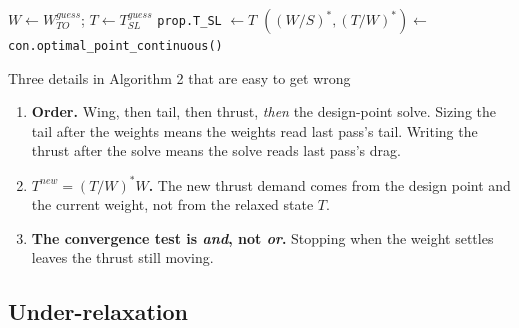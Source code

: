 \documentclass[11pt, a4paper]{article}
\begin{document}
\begin{algorithm}[H]
\SetAlgoLined
\DontPrintSemicolon
{}
$W \leftarrow W_{TO}^{guess}$; \; $T \leftarrow T_{SL}^{guess}$\;
\texttt{prop.T\_SL} $\leftarrow T$ 
$\left((W/S)^*, (T/W)^*\right) \leftarrow$ \texttt{con.optimal\_point\_continuous()}\;
\caption{\texttt{SizingLoopL2} --- two state variables. [Martins slide 8]}
\end{algorithm}

\begin{warnbox}{Three details in Algorithm 2 that are easy to get wrong}
\begin{enumerate}[nosep, leftmargin=*]
  \item \textbf{Order.} Wing, then tail, then thrust, \emph{then} the design-point
        solve. Sizing the tail after the weights means the weights read last
        pass's tail. Writing the thrust after the solve means the solve reads
        last pass's drag.
  \item \textbf{$T^{new} = (T/W)^* W$.} The new thrust demand comes from the
        design point and the current weight, not from the relaxed state $T$.
  \item \textbf{The convergence test is \emph{and}, not \emph{or}.} Stopping when
        the weight settles leaves the thrust still moving.
\end{enumerate}
\end{warnbox}

\subsection{Under-relaxation}
\end{document}
